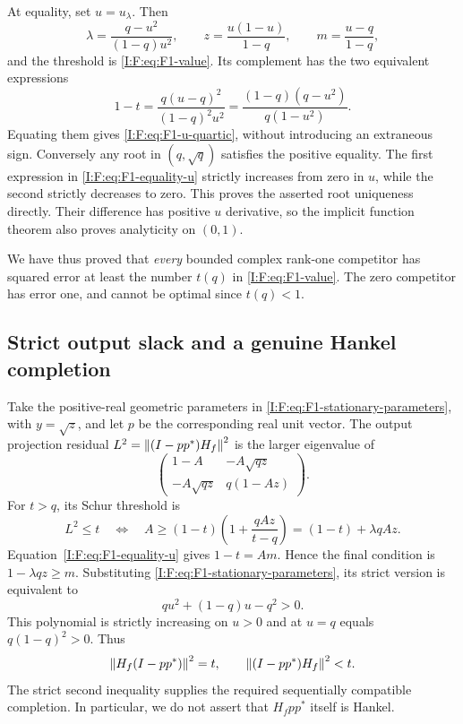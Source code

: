 At equality, set $u=u_\lambda$. Then
\begin{equation}
 \lambda=\frac{q-u^2}{(1-q)u^2},\qquad
 z=\frac{u(1-u)}{1-q},\qquad
 m=\frac{u-q}{1-q},
 \label{I:F:eq:F1-stationary-parameters}
\end{equation}
and the threshold is \eqref{I:F:eq:F1-value}. Its complement has the two
equivalent expressions
\begin{equation}
 1-t=\frac{q(u-q)^2}{(1-q)^2u^2}
     =\frac{(1-q)(q-u^2)}{q(1-u^2)}.
 \label{I:F:eq:F1-equality-u}
\end{equation}
Equating them gives \eqref{I:F:eq:F1-u-quartic}, without introducing an
extraneous sign. Conversely any root in $(q,\sqrt q)$ satisfies the
positive equality. The first expression in \eqref{I:F:eq:F1-equality-u}
strictly increases from zero in $u$, while the second strictly decreases
to zero. This proves the asserted root uniqueness directly. Their
difference has positive $u$ derivative, so the implicit function theorem
also proves analyticity on $(0,1)$.

We have thus proved that \emph{every} bounded complex rank-one competitor
has squared error at least the number $t(q)$ in
\eqref{I:F:eq:F1-value}. The zero competitor has error one, and cannot be
optimal since $t(q)<1$.

\subsection{Strict output slack and a genuine Hankel completion}

Take the positive-real geometric parameters in
\eqref{I:F:eq:F1-stationary-parameters}, with $y=\sqrt z$, and let $p$ be
the corresponding real unit vector. The output projection residual
$L^2=\left\lVert(I-pp^*)H_f\right\rVert^2$ is the larger eigenvalue of
\[
 \begin{pmatrix}
 1-A&-A\sqrt{qz}\\
 -A\sqrt{qz}&q(1-Az)
 \end{pmatrix}.
\]
For $t>q$, its Schur threshold is
\begin{equation}
 L^2\le t
 \quad\Longleftrightarrow\quad
 A\ge(1-t)\left(1+\frac{qAz}{t-q}\right)
 =(1-t)+\lambda qAz.
 \label{I:F:eq:F1-left-feasibility}
\end{equation}
Equation~\eqref{I:F:eq:F1-equality-u} gives $1-t=Am$. Hence the final
condition is $1-\lambda qz\ge m$. Substituting
\eqref{I:F:eq:F1-stationary-parameters}, its strict version is equivalent to
\[
 qu^2+(1-q)u-q^2>0.
\]
This polynomial is strictly increasing on $u>0$ and at $u=q$ equals
$q(1-q)^2>0$. Thus
\begin{equation}
 \left\lVert H_f(I-pp^*)\right\rVert^2=t,\qquad
 \left\lVert(I-pp^*)H_f\right\rVert^2<t.
 \label{I:F:eq:F1-two-corners}
\end{equation}
The strict second inequality supplies the required sequentially compatible
completion. In particular, we do not assert that $H_fpp^*$ itself is
Hankel.

